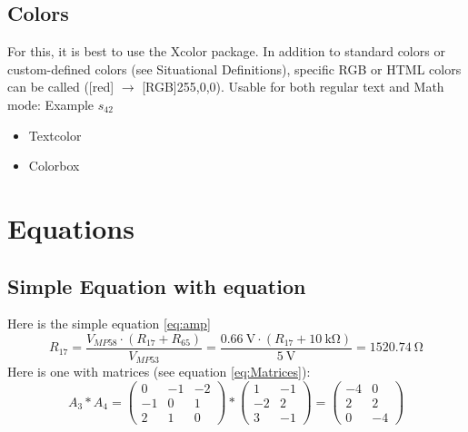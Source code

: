 \documentclass{scrartcl}
\begin{document}
  \subsection{Colors}
    For this, it is best to use the Xcolor package. In addition to standard
    colors or custom-defined colors (see Situational Definitions), specific RGB
    or HTML colors can be called ([red] $\to$ [RGB]{255,0,0}). Usable for both
    regular text and Math mode: \textcolor[RGB]{255,0,0}{Example $s_{42}$}
    \begin{itemize}
      \item \textcolor[RGB]{100,100,100}{Textcolor}
      \item \colorbox{codegreen}{Colorbox}
    \end{itemize}

\section{Equations}
  \subsection{Simple Equation with equation}
    Here is the simple equation \ref{eq:amp}
    \begin{equation}
      \label{eq:amp}
      R_{17}=\frac{V_{MP58}\cdot (R_{17}+R_{65})}{V_{MP53}} = \frac{\SI{0.66}{\volt}\cdot (R_{17}+\SI{10}{\kilo\ohm})}{\SI{5}{\volt}}=\SI{1520.74}{\ohm}
    \end{equation}
    Here is one with matrices (see equation \ref{eq:Matrices}):
    \begin{equation}
      \label{eq:Matrices}
      A_3*A_4=
      \left(
        \begin{array}{ccc}
          0  & -1 & -2 \\
          -1 & 0  & 1  \\
          2  & 1  & 0
        \end{array}
      \right)
      *
      \left(
        \begin{array}{cc}
          1  & -1 \\
          -2 & 2  \\
          3  & -1
        \end{array}
      \right)
      =
      \left(
        \begin{array}{cc}
          -4 & 0  \\
          2  & 2  \\
          0  & -4
        \end{array}
      \right)
    \end{equation}
\end{document}
